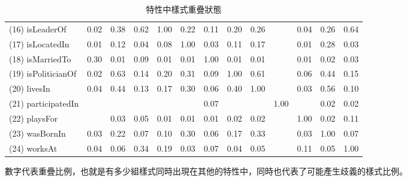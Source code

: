 \begin{table}[t]
\begin{center}
\begin{tabular}{|l||*{12}{c}|}
            (16) isLeaderOf  & 0.02  & 0.38  & 0.62  & 1.00  & 0.22  & 0.11  & 0.20  & 0.26  &    & 0.04  & 0.26  & 0.64 \\
            (17) isLocatedIn  & 0.01  & 0.12  & 0.04  & 0.08  & 1.00  & 0.03  & 0.11  & 0.17  &    & 0.01  & 0.28  & 0.03 \\
            (18) isMarriedTo  & 0.30  & 0.01  & 0.09  & 0.01  & 0.01  & 1.00  & 0.01  & 0.01  &    & 0.01  & 0.02  & 0.03 \\
            (19) isPoliticianOf  & 0.02  & 0.63  & 0.14  & 0.20  & 0.31  & 0.09  & 1.00  & 0.61  &    & 0.06  & 0.44  & 0.15 \\
            (20) livesIn  & 0.04  & 0.44  & 0.13  & 0.17  & 0.30  & 0.06  & 0.40  & 1.00  &    & 0.03  & 0.56  & 0.10 \\
            (21) participatedIn  &    &    &    &    &    & 0.07  &    &    & 1.00  &    & 0.02  & 0.02 \\
            (22) playsFor  &    & 0.03  & 0.05  & 0.01  & 0.01  & 0.01  & 0.02  & 0.02  &    & 1.00  & 0.02  & 0.11 \\
            (23) wasBornIn  & 0.03  & 0.22  & 0.07  & 0.10  & 0.30  & 0.06  & 0.17  & 0.33  &    & 0.03  & 1.00  & 0.07 \\
            (24) worksAt  & 0.04  & 0.06  & 0.34  & 0.19  & 0.03  & 0.07  & 0.04  & 0.05  &    & 0.11  & 0.05  & 1.00 \\
            \hline
        \end{tabular}
        \caption{特性中樣式重疊狀態}
        \normalsize
        數字代表重疊比例，也就是有多少組樣式同時出現在其他的特性中，同時也代表了可能產生歧義的樣式比例。
        \label{t:yago-overlap}
    \end{center}
\end{table}
